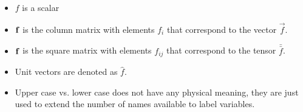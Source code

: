 \documentclass[12pt]{article}
\begin{document}
\begin{itemize}
\item $f$ is a scalar
\item $\bold{f}$ is the column matrix with elements $f_i$ that correspond to the vector $\vec{f}$.
\item $\bold{f}$ is the square matrix with elements $f_{ij}$ that correspond to the tensor $\bar{\bar{f}}$.
\item Unit vectors are denoted as $\hat{f}$.
\item Upper case vs. lower case does not have any physical meaning, they are just used to extend the number of names available to label variables.
\end{itemize}
\end{document}
